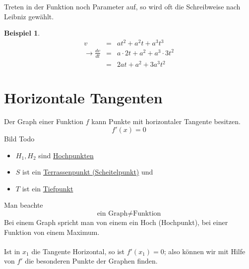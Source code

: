 \documentclass{report}
\newtheorem{myexample}{Beispiel}
\begin{document}
\noindent
Treten in der Funktion noch Parameter auf, so wird oft die Schreibweise nach Leibniz gewählt.
\begin{myexample}
	\begin{eqnarray*}
		v &=& at^2 + a^2t + a^3t^3\\
		\to \frac{dv}{dt} &=& a \cdot 2t + a^2 + a^3 \cdot 3t^2\\
		&=& 2at + a^2 + 3a^3t^2
	\end{eqnarray*}
\end{myexample}
\newpage
\section{Horizontale Tangenten}
Der Graph einer Funktion $f$ kann Punkte mit horizontaler Tangente besitzen.
\begin{equation*}f'(x)=0\end{equation*}
Bild Todo\\
\begin{itemize}
\item $H_1, H_2$ sind \underline{Hochpunkten} 
\item $S$ ist ein \underline{Terrassenpunkt (Scheitelpunkt)} und
\item $T$ ist ein \underline{Tiefpunkt} 
\end{itemize}
Man beachte
\begin{equation*}\text{ein Graph} \not = \text{Funktion}\end{equation*}
Bei einem Graph spricht man von einem ein Hoch (Hochpunkt), bei einer Funktion von einem Maximum.\\
\\
Ist in $x_1$ die Tangente Horizontal, so ist $f'(x_1) = 0$; also können wir mit Hilfe von $f'$ die besonderen Punkte der Graphen finden.
\end{document}
